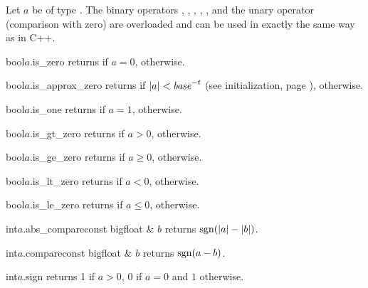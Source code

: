 
\COMP

Let $a$ be of type .  The binary operators \code{==}, \code{!=}, \code{>=},
\code{<=}, \code{>}, \code{<} and the unary operator \code{!} (comparison with zero) are
overloaded and can be used in exactly the same way as in C++.

\begin{cfcode}{bool}{$a$.is_zero}{}
  returns \TRUE if $a = 0$, \FALSE otherwise.
\end{cfcode}

\begin{cfcode}{bool}{$a$.is_approx_zero}{}
  returns \TRUE if $|a| < \mathit{\mathit{base}}^{-t}$ (see initialization, page
  \pageref{bigfloat_init}), \FALSE otherwise.
\end{cfcode}

\begin{cfcode}{bool}{$a$.is_one}{}
  returns \TRUE if $a = 1$, \FALSE otherwise.
\end{cfcode}

\begin{cfcode}{bool}{$a$.is_gt_zero}{}
  returns \TRUE if $a > 0$, \FALSE otherwise.
\end{cfcode}

\begin{cfcode}{bool}{$a$.is_ge_zero}{}
  returns \TRUE if $a \geq 0$, \FALSE otherwise.
\end{cfcode}

\begin{cfcode}{bool}{$a$.is_lt_zero}{}
  returns \TRUE if $a < 0$, \FALSE otherwise.
\end{cfcode}

\begin{cfcode}{bool}{$a$.is_le_zero}{}
  returns \TRUE if $a \leq 0$, \FALSE otherwise.
\end{cfcode}

\begin{cfcode}{int}{$a$.abs_compare}{const bigfloat & $b$}
  returns $\operatorname{sgn}(|a| - |b|)$.
\end{cfcode}

\begin{cfcode}{int}{$a$.compare}{const bigfloat & $b$}
  returns $\operatorname{sgn}(a - b)$.
\end{cfcode}

\begin{cfcode}{int}{$a$.sign}{}
  returns 1 if $a > 0$, $0$ if $a = 0$ and $1$ otherwise.
\end{cfcode}

